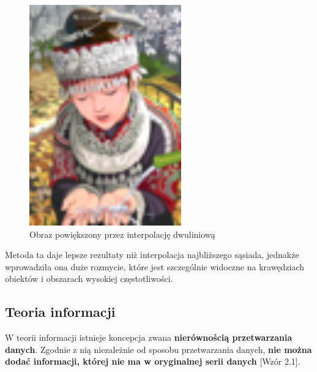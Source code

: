 \begin{figure}[ht]
\begin{minipage}[t]{0.33\linewidth}
        \includegraphics[width=\linewidth]{Rozdziały/02.Podstawy_teoretyczne/comic_BILINEARx4.png}
        \caption{Obraz powiększony przez interpolację dwuliniową}
        \label{fig:image10}
    \end{minipage}
\end{figure}


Metoda ta daje lepsze rezultaty niż interpolacja najbliższego sąsiada, jednakże wprowadziła ona duże rozmycie, które jest szczególnie widoczne na krawędziach obiektów i obszarach wysokiej częstotliwości.

\subsection*{Teoria informacji}

W teorii informacji istnieje koncepcja zwana \textbf{nierównością przetwarzania danych}. Zgodnie z nią niezależnie od sposobu przetwarzania danych, \textbf{nie można dodać informacji, której nie ma w oryginalnej serii danych}  [Wzór 2.1].

